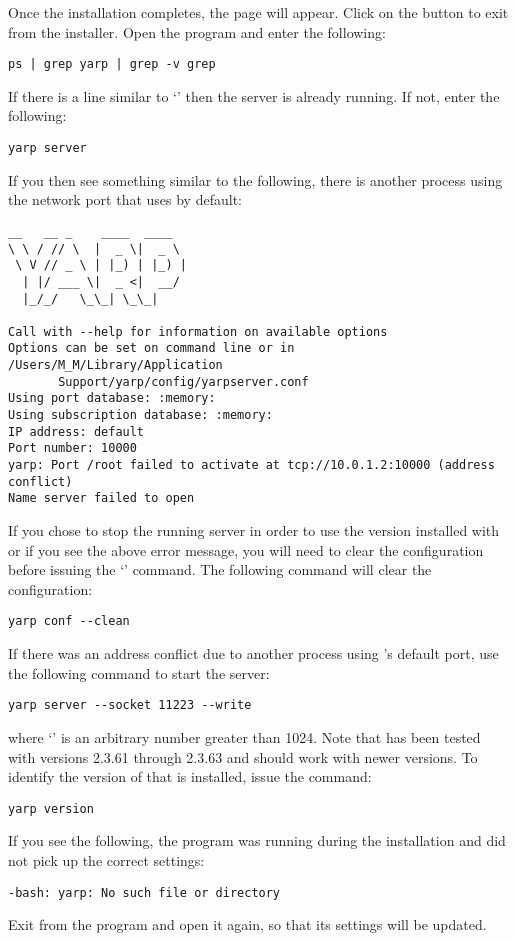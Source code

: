\condPage{}
Once the installation completes, the  page will appear.
Click on the  button to exit from the installer.
\condPage
\tertiaryEnd
{}
Open the  program and enter the following:
\outputBegin
\begin{verbatim}
ps | grep yarp | grep -v grep
\end{verbatim}
\outputEnd{}
If there is a line similar to `'
then the \yarp{} server is already running. If not, enter the following:
\outputBegin
\begin{verbatim}
yarp server
\end{verbatim}
\outputEnd{}
If you then see something similar to the following, there is another process using the
network port that \yarp{} uses by default:
\outputBegin
\begin{verbatim}
__   __ _    ____  ____  
\ \ / // \  |  _ \|  _ \ 
 \ V // _ \ | |_) | |_) |
  | |/ ___ \|  _ <|  __/ 
  |_/_/   \_\_| \_\_|    

Call with --help for information on available options
Options can be set on command line or in /Users/M_M/Library/Application
       Support/yarp/config/yarpserver.conf
Using port database: :memory:
Using subscription database: :memory:
IP address: default
Port number: 10000
yarp: Port /root failed to activate at tcp://10.0.1.2:10000 (address conflict)
Name server failed to open
\end{verbatim}
\outputEnd{}
If you chose to stop the running \yarp{} server in order to use the version installed with
\mplusm{} or if you see the above error message, you will need to clear the \yarp{}
configuration before issuing the `\asCode{yarp~server}' command.
The following command will clear the \yarp{} configuration:
\outputBegin
\begin{verbatim}
yarp conf --clean
\end{verbatim}
\outputEnd{}
If there was an address conflict due to another process using \yarp's default port, use
the following command to start the \yarp{} server:
\outputBegin
\begin{verbatim}
yarp server --socket 11223 --write
\end{verbatim}
\outputEnd{}
where `' is an arbitrary number greater than 1024.
Note that \mplusm{} has been tested with \yarp{} versions 2.3.61 through 2.3.63 and should
work with newer versions.
To identify the version of \yarp{} that is installed, issue the command:
\outputBegin
\begin{verbatim}
yarp version
\end{verbatim}
\outputEnd{}
If you see the following, the  program was running during the
installation and did not pick up the correct settings:
\outputBegin
\begin{verbatim}
-bash: yarp: No such file or directory
\end{verbatim}
\outputEnd{}
Exit from the  program and open it again, so that its settings will be
updated.\\

